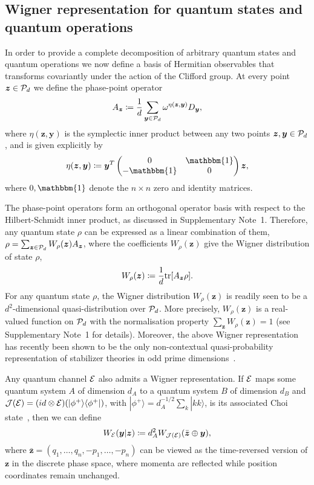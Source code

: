 \documentclass[
onecolumn,
superscriptaddress
]{revtex4-1}
\def\>{\rangle}
\def\<{\langle}
\def\id{\mathbbm{1}}
\renewcommand{\tr}{{\rm{tr}}}
\def\y{\boldsymbol{y}}
\def\z{\boldsymbol{z}}
\def\E{{\cal E}}
\def\J{{\cal J}}
\renewcommand{\P}{{\cal P}}
\begin{document}
\subsection*{Wigner representation for quantum states and quantum operations}

In order to provide a complete decomposition of arbitrary quantum states and quantum operations we now define a basis of Hermitian observables that transforms covariantly under the action of the Clifford group. At every point $\z \in \P_d$ we define the phase-point operator
\begin{equation}\label{eq:ax}
	A_{\z} \coloneqq \frac{1}{d} \sum_{\y \in \P_d} \omega^{\eta(\z, \y)} D_{\y}, 
\end{equation}
where $\eta(\z, \y)$ is the symplectic inner product between any two points $\z,\y \in \P_d$, and is given explicitly by
\begin{equation}
	\eta(\z, \y) \coloneqq \y^T \begin{pmatrix}
		0  & \id \\
		-\id & 0 \\
	\end{pmatrix} \z,
\end{equation}
where $0, \id$ denote the $n\times n$ zero and identity matrices.

The phase-point operators form an orthogonal operator basis with respect to the Hilbert-Schmidt inner product, as discussed in Supplementary Note~1.
Therefore, any quantum state $\rho$ can be expressed as a linear combination of them, $\rho = \sum_{\z \in \P_d} W_\rho(\z) A_{\z}$, where the coefficients $W_\rho(\z)$ give the Wigner distribution of state $\rho$,
\begin{equation}\label{eq:wstate}
    W_\rho(\z) \coloneqq \frac{1}{d}\tr[A_{\z} \rho].
\end{equation}
For any quantum state $\rho$, the Wigner distribution $W_\rho(\z)$ is readily seen to be a $d^2$-dimensional quasi-distribution over $\P_d$. More precisely, $W_\rho(\z)$ is a real-valued function on $\P_d$ with the normalisation property $\sum_{\z} W_\rho(\z) = 1$ (see Supplementary Note~1 for details). Moreover, the above Wigner representation has recently been shown to be the only non-contextual quasi-probability representation of stabilizer theories in odd prime dimensions~\cite{schmid2021noncontextual}.

Any quantum channel $\E$ also admits a Wigner representation. If $\E$ maps some quantum system $A$ of dimension $d_A$ to a quantum system $B$ of dimension $d_B$ and $\J(\E) = (id \otimes \E) (|\phi^+\> \<\phi^+|)$, with $|\phi^+\> = d_A^{-1/2} \sum_k |kk\>$, is its associated Choi state~\cite{watrous_2018}, then we can define
\begin{equation}\label{Wigner-Choi}
W_{\E}(\y |\z) \coloneqq d_A^2 W_{\J(\E)}(\bar{\z} \oplus \y),
\end{equation}
where $\bar{\z} = (q_1, \dots, q_n, -p_1, \dots, -p_n)$ can be viewed as the time-reversed version of $\z$ in the discrete phase space, where momenta are reflected while position coordinates remain unchanged. 
\end{document}
